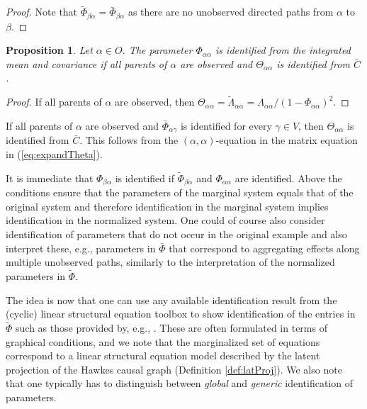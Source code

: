 \documentclass[accepted]{uai2021} %
\newtheorem{prop}[thm]{Proposition}
\begin{document}
\begin{proof}
	Note that $\tilde{\Phi}_{\beta\alpha} = \bar{\Phi}_{\beta\alpha}$ as there 
	are no 
	unobserved directed paths from $\alpha$ to $\beta$.
\end{proof}

\begin{prop}
	Let $\alpha\in O$. The parameter $\Phi_{\alpha\alpha}$ is identified from 
	the 
	integrated mean and covariance if all 
	parents of $\alpha$ are observed and $\Theta_{\alpha\alpha}$ is identified 
	from 
	$\bar{C}$.
\end{prop}

\begin{proof}
	If all parents of $\alpha$ are observed, then $\Theta_{\alpha\alpha} = 
	\tilde{\Lambda}_{\alpha\alpha} = \Lambda_{\alpha\alpha}/(1 - 
	\Phi_{\alpha\alpha})^2$.
\end{proof}

If all parents of $\alpha$ are observed and $\bar{\Phi}_{\alpha\gamma}$ is 
identified for 
 every 
 $\gamma\in V$, then $\Theta_{\alpha\alpha}$ is identified from $\bar{C}$.
This follows from the $(\alpha,\alpha)$-equation in the matrix equation in 
(\ref{eq:expandTheta}).

It is immediate that $\Phi_{\beta\alpha}$ is identified if 
$\tilde{\Phi}_{\beta\alpha}$ and $\Phi_{\alpha\alpha}$ are identified. Above 
the 
conditions ensure that the parameters of the marginal system equals that of the 
original system and therefore identification in the marginal system implies 
identification in the normalized system. One could of course also consider 
identification of parameters that do not occur in the original example and also 
interpret these, e.g., parameters in $\bar{\Phi}$ that 
correspond to aggregating effects along multiple unobserved paths, similarly to 
the 
interpretation of the normalized parameters in $\tilde{\Phi}$.


The idea is now 
that one can use any available identification result from the (cyclic) linear 
structural equation toolbox to show identification of the entries in 
$\tilde{\Phi}$ such as those provided by, e.g., \cite{foygelHalftrek2012, 
chenNIPS2016, 
weihs2018}. 
These are often 
formulated in terms of graphical 
conditions, and we note that the 
marginalized set of equations correspond to a linear structural 
equation model described by the latent projection of the Hawkes causal graph 
(Definition \ref{def:latProj}). We also note that one typically has to 
distinguish between \emph{global} and \emph{generic} identification of 
parameters.
\end{document}
